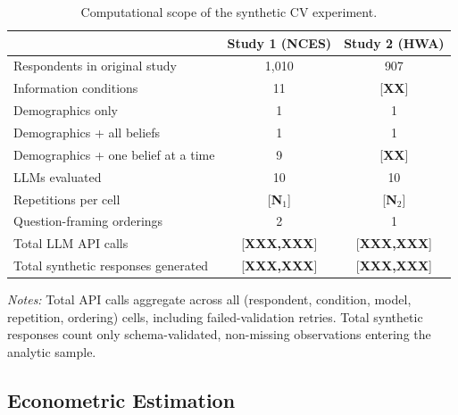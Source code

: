 \documentclass[12pt]{article}
\begin{document}
\begin{table}[h]
    \centering
    \caption{Computational scope of the synthetic CV experiment.}
    \label{tab:compute}
    \begin{threeparttable}
    \begin{tabular}{lcc}
        \toprule
                                                       & Study 1 (NCES) & Study 2 (HWA) \\
        \midrule
        Respondents in original study                  & 1{,}010        & 907 \\
        Information conditions                         & 11             & [\textbf{XX}] \\
        \quad Demographics only                        & 1              & 1 \\
        \quad Demographics + all beliefs               & 1              & 1 \\
        \quad Demographics + one belief at a time      & 9              & [\textbf{XX}] \\
        LLMs evaluated                                 & 10             & 10 \\
        Repetitions per cell                           & [\textbf{N$_1$}] & [\textbf{N$_2$}] \\
        Question-framing orderings                     & 2              & 1 \\
        Total LLM API calls                            & [\textbf{XXX,XXX}] & [\textbf{XXX,XXX}] \\
        Total synthetic responses generated            & [\textbf{XXX,XXX}] & [\textbf{XXX,XXX}] \\
        \bottomrule
    \end{tabular}
    \begin{tablenotes}\footnotesize
    \item \textit{Notes:} Total API calls aggregate across all
    (respondent, condition, model, repetition, ordering) cells, including
    failed-validation retries. Total synthetic responses count only
    schema-validated, non-missing observations entering the analytic sample.
    \end{tablenotes}
    \end{threeparttable}
\end{table}

\subsection{Econometric Estimation}\label{sec:methods-econ}
\end{document}
